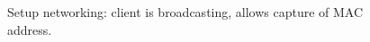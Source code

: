 \begin{figure}[h!]
  \begin{center}
    \centerline{
      }
    \caption{Setup networking: client is broadcasting, allows capture
      of MAC address.}
    \label{fig:sbs-collect-broadcast} 
  \end{center}
\end{figure}

